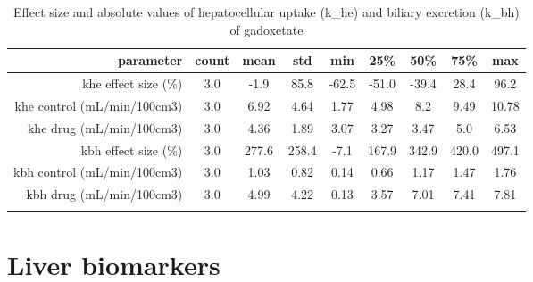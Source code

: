 \documentclass{epflreport}%
\begin{document}
%
\begin{longtable}{rcccccccc}%
\hline%
parameter&count&mean&std&min&25\%&50\%&75\%&max\\%
\hline%
khe effect size (\%)&3.0&{-}1.9&85.8&{-}62.5&{-}51.0&{-}39.4&28.4&96.2\\%
khe control (mL/min/100cm3)&3.0&6.92&4.64&1.77&4.98&8.2&9.49&10.78\\%
khe drug (mL/min/100cm3)&3.0&4.36&1.89&3.07&3.27&3.47&5.0&6.53\\%
kbh effect size (\%)&3.0&277.6&258.4&{-}7.1&167.9&342.9&420.0&497.1\\%
kbh control (mL/min/100cm3)&3.0&1.03&0.82&0.14&0.66&1.17&1.47&1.76\\%
kbh drug (mL/min/100cm3)&3.0&4.99&4.22&0.13&3.57&7.01&7.41&7.81\\%
\hline%
\caption{Effect size and absolute values of hepatocellular uptake (k\_he) and biliary excretion (k\_bh) of gadoxetate} \\%
\end{longtable}%
\clearpage%
\section{Liver biomarkers}%
\label{sec:Liverbiomarkers}%
\end{document}
